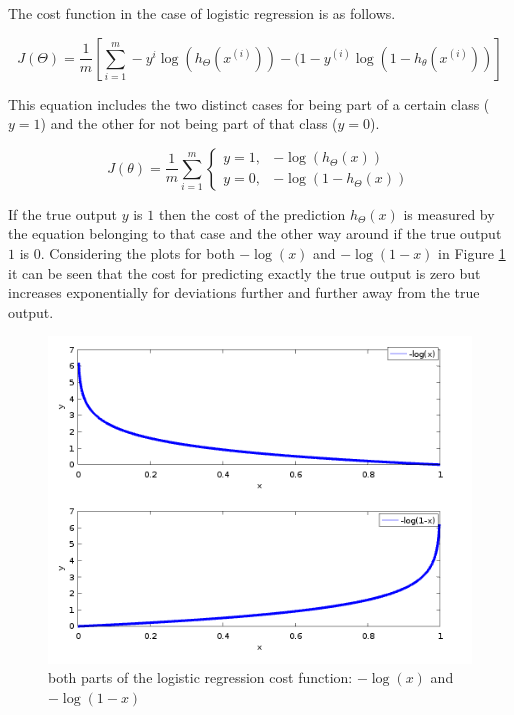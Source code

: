The cost function in the case of logistic regression is as follows.

\begin{equation}
    J(\Theta) = \frac{1}{m} \left[\sum_{i=1}^m -y^{i} \log(h_\Theta(x^{(i)})) - 
    (1-y^{(i)} \log(1-h_\theta(x^{(i)}))\right]
    \label{eq:log_cost}
\end{equation}

This equation includes the two distinct cases for being part of a certain class ($y=1$) and the other for not being part of that class ($y=0$).

\begin{equation}
J(\theta)= \frac{1}{m} \sum_{i=1}^m \begin{cases}
    y = 1, & -\log(h_\Theta(x))\\
    y = 0, & -\log(1-h_\Theta(x))
  \end{cases}
\end{equation}

If the true output $y$ is $1$ then the cost of the prediction $h_\Theta(x)$ is measured by the equation belonging to that case and the other way around if the true output $1$ is $0$. Considering the plots for both $-\log(x)$ and $-\log(1-x)$ in Figure \ref{fig:plot_neglog} it can be seen that the cost for predicting exactly the true output is zero but increases exponentially for deviations further and further away from the true output. 

\begin{figure}[H]
\centering
\includegraphics[width=0.8\linewidth]{include/images/plot_neglog.png}
\caption{both parts of the logistic regression cost function: $-\log(x)$ and $-\log(1-x)$}
\label{fig:plot_neglog}
\end{figure}

